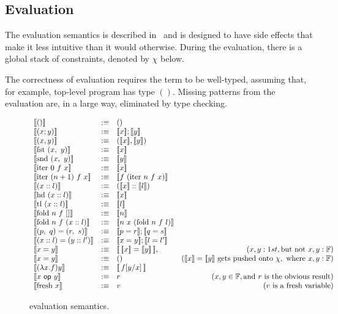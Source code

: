 \documentclass[
    9pt,            
    techreport,       
    affiltop,       
]{art}
\begin{document}
\subsection{Evaluation}\label{sec:current-evaluation}

The evaluation semantics is described in~ and is designed to have side effects that make it less intuitive than it would otherwise. During the evaluation, there is a global stack of constraints, denoted by $\chi$ below. 

The correctness of evaluation requires the term to be well-typed, assuming that, for example, top-level \VampIR{} program has type $()$. Missing patterns from the evaluation are, in a large way, eliminated by type checking. 

\begin{figure}[!htb]
    \centering
\begin{equation*}
\begin{array}{lclr}
    \evalT{ ()} &:\equiv &() &\\
    \evalT{ (x; y)} &:\equiv &\evalT{x}; \evalT{y} &\\
    \evalT{ (x, y)} &:\equiv &(\evalT{x}, \evalT{y}) &\\
    \evalT{ \text{fst}\ (x,\ y)} &:\equiv &\evalT{x} &\\
    \evalT{ \text{snd}\ (x,\ y)} &:\equiv &\evalT{y} &\\
    \evalT{ \text{iter}\ 0\ f\ x} &:\equiv &\evalT{x} &\\
     \evalT{ \text{iter}\ (n+1)\ f\ x} &:\equiv &\evalT{f\ (\text{iter}\ n\ f\ x)} &\\
    \evalT{ (x :: l)} &:\equiv &(\evalT{x} :: \evalT{l})&\\
    \evalT{ \text{hd}\ (x::l)} &:\equiv &\evalT{x} &\\
    \evalT{ \text{tl}\ (x::l)} &:\equiv &\evalT{l} &\\
    \evalT{ \text{fold}\ n\ f\ []} &:\equiv &\evalT{n} &\\
    \evalT{ \text{fold}\ n\ f\ (x::l)} &:\equiv &\evalT{n\ x\ (\text{fold}\ n\ f\ l)} &\\
    \evalT{ (p,\ q) = (r,\ s)} &:\equiv &\evalT{p = r}; \evalT{q = s}\\
    \evalT{ (x :: l ) = (y :: l')} &:\equiv &\evalT{x = y}; \evalT{l = l'}\\
    \evalT{ x = y} &:\equiv &\evalT{\,\evalT{x} = \evalT{y}\,}, &(x, y : 1st, \text{but not}\ x, y : \mathbb{F})\\ 
    \evalT{x = y} &:\equiv &()  &(\evalT{x} = \evalT{y}\ \text{gets pushed onto}\ \chi,\ \text{where}\ x, y : \mathbb{F})\\
    \evalT{ (\lambda x. f) y} &:\equiv &\evalT{\,f[y/x] \, } &\\
    \evalT{x\ \mathsf{op}\ y} &:\equiv &r &(x, y \in \mathbb{F}, \text{and}\ r\ \text{is the obvious result}) \\
    \evalT{ \text{fresh}\ x} &:\equiv &v &(v\ \text{is a fresh variable})
\end{array}
\end{equation*}
    \caption{\VampIR{} evaluation semantics.}
    \label{fig:enter-label}
\end{figure}
\end{document}
